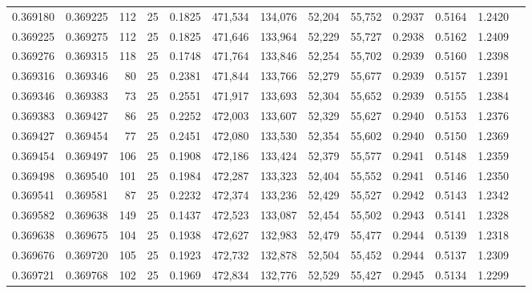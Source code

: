 \begin{tabular}{rrrrrrrrrrrrr}
0.369180 & 0.369225 &   112 &  25 &                                     0.1825 & 471,534 & 134,076 &  52,204 &  55,752 & 0.2937 & 0.5164 & 1.2420 \\
0.369225 & 0.369275 &   112 &  25 &                                     0.1825 & 471,646 & 133,964 &  52,229 &  55,727 & 0.2938 & 0.5162 & 1.2409 \\
0.369276 & 0.369315 &   118 &  25 &                                     0.1748 & 471,764 & 133,846 &  52,254 &  55,702 & 0.2939 & 0.5160 & 1.2398 \\
0.369316 & 0.369346 &    80 &  25 &                                     0.2381 & 471,844 & 133,766 &  52,279 &  55,677 & 0.2939 & 0.5157 & 1.2391 \\
0.369346 & 0.369383 &    73 &  25 &                                     0.2551 & 471,917 & 133,693 &  52,304 &  55,652 & 0.2939 & 0.5155 & 1.2384 \\
0.369383 & 0.369427 &    86 &  25 &                                     0.2252 & 472,003 & 133,607 &  52,329 &  55,627 & 0.2940 & 0.5153 & 1.2376 \\
0.369427 & 0.369454 &    77 &  25 &                                     0.2451 & 472,080 & 133,530 &  52,354 &  55,602 & 0.2940 & 0.5150 & 1.2369 \\
0.369454 & 0.369497 &   106 &  25 &                                     0.1908 & 472,186 & 133,424 &  52,379 &  55,577 & 0.2941 & 0.5148 & 1.2359 \\
0.369498 & 0.369540 &   101 &  25 &                                     0.1984 & 472,287 & 133,323 &  52,404 &  55,552 & 0.2941 & 0.5146 & 1.2350 \\
0.369541 & 0.369581 &    87 &  25 &                                     0.2232 & 472,374 & 133,236 &  52,429 &  55,527 & 0.2942 & 0.5143 & 1.2342 \\
0.369582 & 0.369638 &   149 &  25 &                                     0.1437 & 472,523 & 133,087 &  52,454 &  55,502 & 0.2943 & 0.5141 & 1.2328 \\
0.369638 & 0.369675 &   104 &  25 &                                     0.1938 & 472,627 & 132,983 &  52,479 &  55,477 & 0.2944 & 0.5139 & 1.2318 \\
0.369676 & 0.369720 &   105 &  25 &                                     0.1923 & 472,732 & 132,878 &  52,504 &  55,452 & 0.2944 & 0.5137 & 1.2309 \\
0.369721 & 0.369768 &   102 &  25 &                                     0.1969 & 472,834 & 132,776 &  52,529 &  55,427 & 0.2945 & 0.5134 & 1.2299 \\

\end{tabular}
